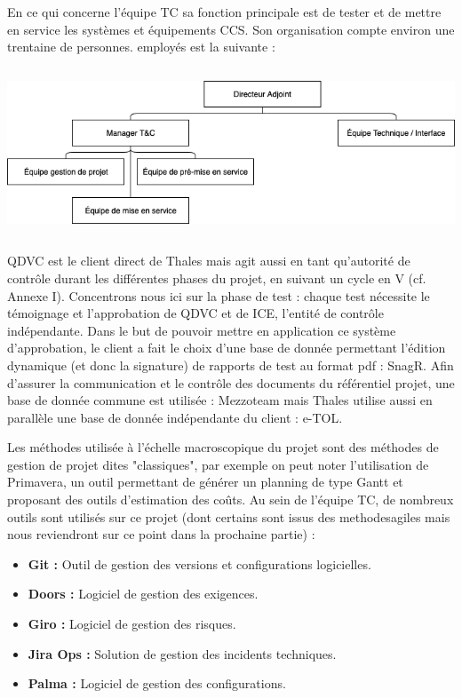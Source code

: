 En ce qui concerne l'équipe \gls{TC} sa fonction principale est de tester et de mettre en service les systèmes et équipements \gls{CCS}.
Son organisation compte environ une trentaine de personnes.
employés est la suivante :

\begin{center}
\includegraphics[height=5cm]{ressources/images/figures/OBS2.png}
\end{center}

QDVC est le client direct de Thales mais agit aussi en tant qu'autorité de contrôle durant les différentes phases du projet, en suivant un cycle en V (cf. Annexe I). Concentrons nous ici sur la phase de test : chaque test nécessite le témoignage et l'approbation de QDVC et de ICE, l'entité de contrôle indépendante.
Dans le but de pouvoir mettre en application ce système d'approbation, le client a fait le choix d'une base de donnée permettant l'édition dynamique (et donc la signature) de rapports de test au format pdf : \gls{SnagR}.
Afin d'assurer la communication et le contrôle des documents du référentiel projet, une base de donnée commune est utilisée : \gls{Mezzoteam} mais Thales utilise aussi en parallèle une  base de donnée indépendante du client : \gls{e-TOL}.

Les méthodes utilisée à l'échelle macroscopique du projet sont des méthodes de gestion de projet dites "classiques", par exemple on peut noter l'utilisation de Primavera, un outil permettant de générer un planning de type Gantt et proposant des outils d'estimation des coûts.
Au sein de l'équipe \gls{TC}, de nombreux outils sont utilisés sur ce projet (dont certains sont issus des \gls{methodesagiles} mais nous reviendront sur ce point dans la prochaine partie) :
\begin{itemize}
\item \textbf{\gls{Git} :} Outil de gestion des versions et configurations logicielles.
\item \textbf{Doors :} Logiciel de gestion des exigences.
\item \textbf{Giro :} Logiciel de gestion des risques.
\item \textbf{Jira Ops :} Solution de gestion des incidents techniques.
\item \textbf{Palma :} Logiciel de gestion des configurations. 
\end{itemize}

